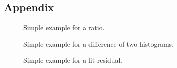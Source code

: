 \begin{appendix}
  \section{Appendix}
  \begin{figure}[h]
    
    \caption{Simple example for a ratio.}
    \label{lst:ratio}
  \end{figure}
  
  \begin{figure}[h]
    
    \caption{Simple example for a difference of two histograms.}
    \label{lst:diff}
  \end{figure}
  
  \begin{figure}[h]
    
    \caption{Simple example for a fit residual.}
    \label{lst:fitres}
  \end{figure}
  \printbibliography
\end{appendix}
